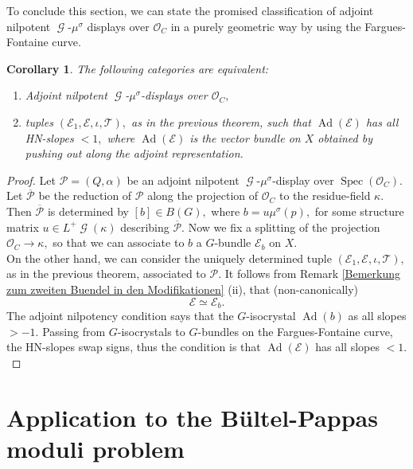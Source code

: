 \documentclass[a4paper,10,5 pt]{amsart}
\newtheorem{Corollary}[Satz]{Corollary}
\theoremstyle{definition}
\DeclareMathOperator{\Spec}{Spec}
\DeclareMathOperator{\Ad}{Ad}
\DeclareMathOperator{\G}{\mathcal{G}}
\begin{document}
To conclude this section, we can state the promised classification of adjoint nilpotent $\G$-$\mu^{\sigma}$ displays over $\mathcal{O}_{C}$ in a purely geometric way by using the Fargues-Fontaine curve.
\begin{Corollary}
The following categories are equivalent:
\begin{enumerate}
\item[(a):] Adjoint nilpotent $\G$-$\mu^{\sigma}$-displays over $\mathcal{O}_{C},$
\item[(b):] tuples $(\mathcal{E}_{1},\mathcal{E},\iota,\mathcal{T}),$ as in the previous theorem, such that $\Ad(\mathcal{E})$ has all HN-slopes $<1,$ where $\Ad(\mathcal{E})$ is the vector bundle on $X$ obtained by pushing out along the adjoint representation.
\end{enumerate}
\end{Corollary}
\begin{proof}
Let $\mathcal{P}=(Q,\alpha)$ be an adjoint nilpotent $\G$-$\mu^{\sigma}$-display over $\Spec(\mathcal{O}_{C}).$ Let $\overline{\mathcal{P}}$ be the reduction of $\mathcal{P}$ along the projection of $\mathcal{O}_{C}$ to the residue-field $\kappa.$ Then $\overline{\mathcal{P}}$ is determined by $[b]\in B(G),$ where $b=u\mu^{\sigma}(p),$ for some structure matrix $u\in L^{+}\G(\kappa)$ describing $\overline{\mathcal{P}}.$ Now we fix a splitting of the projection $\mathcal{O}_{C}\rightarrow \kappa,$ so that we can associate to $b$ a $G$-bundle $\mathcal{E}_{b}$ on $X.$
\\
On the other hand, we can consider the uniquely determined tuple $(\mathcal{E}_{1},\mathcal{E},\iota,\mathcal{T}),$ as in the previous theorem, associated to $\mathcal{P}.$ It follows from Remark \ref{Bemerkung zum zweiten Buendel in den Modifikationen} (ii), that (non-canonically)
$$
\mathcal{E}\simeq \mathcal{E}_{b}.
$$
The adjoint nilpotency condition says that the $G$-isocrystal $\Ad(b)$ as all slopes $>-1.$ Passing from $G$-isocrystals to $G$-bundles on the Fargues-Fontaine curve, the HN-slopes swap signs, thus the condition is that $\Ad(\mathcal{E})$ has all slopes $<1.$
\end{proof}
\section{Application to the Bültel-Pappas moduli problem}
\end{document}
